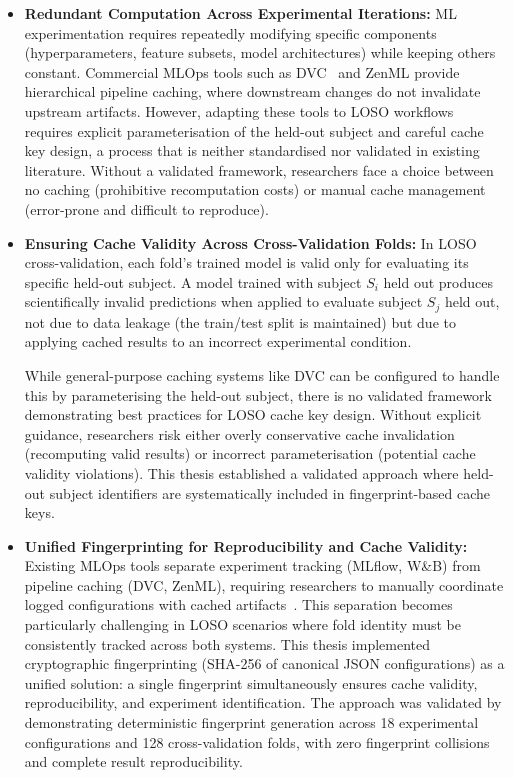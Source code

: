 \begin{itemize}

\item \textbf{Redundant Computation Across Experimental Iterations:}
ML experimentation requires repeatedly modifying specific components
(hyperparameters, feature subsets, model architectures) while keeping others
constant. Commercial MLOps tools such as DVC~\cite{dvc_pipelines} and ZenML provide
hierarchical pipeline caching, where downstream changes do not
invalidate upstream artifacts. However, adapting these tools to LOSO workflows
requires explicit parameterisation of the held-out subject and careful cache
key design, a process that is neither standardised nor validated in existing
literature. Without a validated framework, researchers face a choice between
no caching (prohibitive recomputation costs) or manual cache management
(error-prone and difficult to reproduce).

\item \textbf{Ensuring Cache Validity Across Cross-Validation Folds:}
In LOSO cross-validation, each fold's trained model is valid only for
evaluating its specific held-out subject. A model trained with subject $S_i$
held out produces scientifically invalid predictions when applied to evaluate
subject $S_j$ held out, not due to data leakage (the train/test split is
maintained) but due to applying cached results to an incorrect experimental
condition.

While general-purpose caching systems like DVC can be configured to handle this
by parameterising the held-out subject, there is no validated framework
demonstrating best practices for LOSO cache key design. Without explicit
guidance, researchers risk either overly conservative cache invalidation
(recomputing valid results) or incorrect parameterisation (potential cache
validity violations). This thesis established a validated approach where
held-out subject identifiers are systematically included in fingerprint-based
cache keys.

\item \textbf{Unified Fingerprinting for Reproducibility and Cache Validity:}
Existing MLOps tools separate experiment tracking (MLflow, W\&B) from
pipeline caching (DVC, ZenML), requiring researchers to manually coordinate
logged configurations with cached artifacts~\cite{zaharia2018mlflow,%
wandb2024docs,dvc_pipelines}. This separation becomes particularly
challenging in LOSO scenarios where fold identity must be consistently tracked
across both systems. This thesis implemented cryptographic fingerprinting
(SHA-256 of canonical JSON configurations) as a unified solution: a single
fingerprint simultaneously ensures cache validity, reproducibility, and
experiment identification. The approach was validated by demonstrating
deterministic fingerprint generation across 18 experimental configurations
and 128 cross-validation folds, with zero fingerprint collisions and
complete result reproducibility.

\end{itemize}

